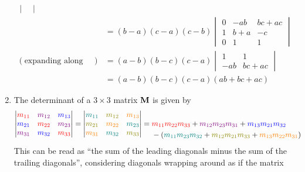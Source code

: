 \documentclass[fleqn,a4paper,11pt]{article}
\begin{document}
\begin{enumerate}[label=\textbf{\arabic*.}]
\begin{alignat*}
\begin{vmatrix}
     \end{vmatrix} \\
    && &= (b - a)(c - a)(c - b)\begin{vmatrix}
      0 & -ab & bc + ac \\
      1 & b + a & -c \\
      0 & 1 & 1
     \end{vmatrix} \\
    (\text{expanding along the first column})
    && &= (a - b)(b - c)(c - a)\begin{vmatrix}
      1 & 1 \\
      -ab & bc + ac
     \end{vmatrix} \\
    && &= (a - b)(b - c)(c - a)(ab + bc + ac)
   \end{alignat*}
  \item
   \begin{lemma}
    \label{lemma_sarrus}
    The determinant of a \(3 \times 3\) matrix \(\mathbf{M}\) is given by
    \begin{align*}
     \begin{vmatrix}
      \color{red}m_{11} & \color{violet}m_{12} & \color{blue}m_{13} \\
      \color{blue}m_{21} & \color{red}m_{22} & \color{violet}m_{23} \\
      \color{violet}m_{31} & \color{blue}m_{32} & \color{red}m_{33}
     \end{vmatrix} =
     \begin{vmatrix}
      \color{teal}m_{11} & \color{olive}m_{12} & \color{orange}m_{13} \\
      \color{olive}m_{21} & \color{orange}m_{22} & \color{teal}m_{23} \\
      \color{orange}m_{31} & \color{teal}m_{32} & \color{olive}m_{33}
     \end{vmatrix} &=
     \begin{aligned}[t]
      &  \textcolor{red}{m_{11} m_{22} m_{33}}
       + \textcolor{violet}{m_{12} m_{23} m_{31}}
       + \textcolor{blue}{m_{13} m_{21} m_{32}} \\
      &-(\textcolor{teal}{m_{11} m_{23} m_{32}}
       + \textcolor{olive}{m_{12} m_{21} m_{33}}
       + \textcolor{orange}{m_{13} m_{22} m_{31}})
     \end{aligned}
    \end{align*}
    This can be read as ``the sum of the leading diagonals minus the sum of the
    trailing diagonals'', considering diagonals wrapping around as if the matrix

\end{lemma}
\end{enumerate}
\end{document}
